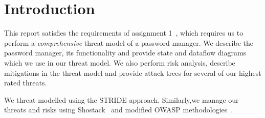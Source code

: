 \chapter{Introduction}
\label{ch:introduction}

This report satisfies the requirements of assignment
1~\cite{2017myersa1handout}, which requires us to perform a
\textit{comprehensive} threat model of a password manager.  We describe the
password manager, its functionality and provide state and dataflow diagrams
which we use in our threat model. We also perform risk analysis, describe
mitigations in the threat model and provide attack trees for several of our highest
rated threats.  

\par We threat modelled using the STRIDE approach.
Similarly,we manage our threats and risks using Shostack~\cite{shostackbook} and modified
OWASP methodologies~\cite{owasprisk}.




